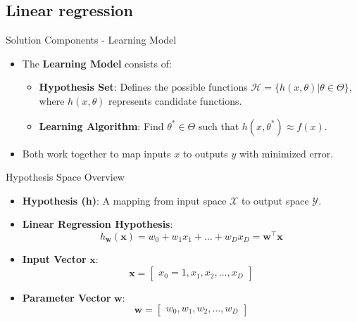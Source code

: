 \documentclass[serif, aspectratio=169]{beamer}
\begin{document}
\subsection{Linear regression}
\begin{frame}{Solution Components - Learning Model}
    \begin{itemize}
        \item The \textbf{Learning Model} consists of:
        \begin{itemize}
            \item \textbf{Hypothesis Set}: Defines the possible functions \( \mathcal{H} = \{h(x, \theta) | \theta \in \Theta\} \), where \( h(x, \theta) \) represents candidate functions.
            \item \textbf{Learning Algorithm}: Find \( \theta^* \in \Theta \) such that \( h(x, \theta^*) \approx f(x) \).
        \end{itemize}
        \item Both work together to map inputs \(x\) to outputs \(y\) with minimized error.
    \end{itemize}
    \vspace{0.5cm}
\end{frame}

\begin{frame}{Hypothesis Space Overview}
    \begin{itemize}
        \item \textbf{Hypothesis (h)}: A mapping from input space \( \mathcal{X} \) to output space \( \mathcal{Y} \).
        \item \textbf{Linear Regression Hypothesis}:
        \[
        h_{\mathbf{w}}(\mathbf{x}) = w_0 + w_1 x_1 + \dots + w_D x_D = \mathbf{w}^\top \mathbf{x}
        \]
        \item \textbf{Input Vector} \( \mathbf{x} \):
        \[
        \mathbf{x} = \begin{bmatrix} x_0 = 1, x_1, x_2, \dots, x_D \end{bmatrix}
        \]
        \item \textbf{Parameter Vector} \( \mathbf{w} \):
        \[
        \mathbf{w} = \begin{bmatrix} w_0, w_1, w_2, \dots, w_D \end{bmatrix}
        \]
    \end{itemize}
\end{frame}
\end{document}
